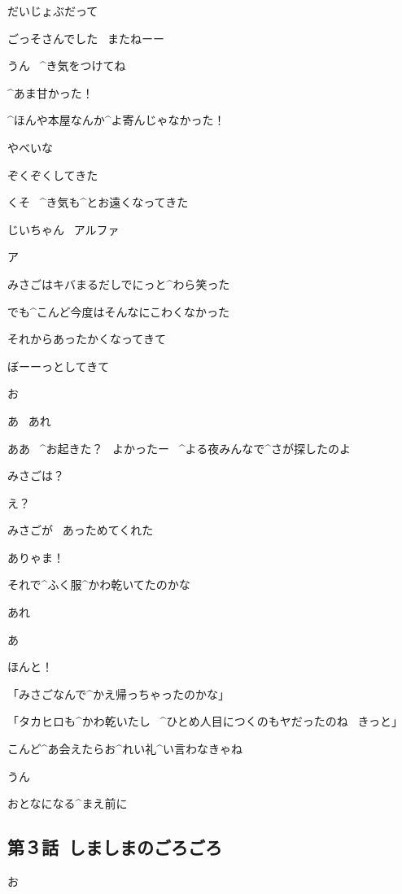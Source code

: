 \Takahiro だいじょぶだって

\Takahiro ごっそさんでした
\ またねーー

\Alpha うん
\ ^{き}{気}をつけてね

\page[56]
\Takahiro ^{あま}{甘}かった！

\Takahiro ^{ほんや}{本屋}なんか^{よ}{寄}んじゃなかった！

\page[57]
\Takahiro やべいな

\Takahiro ぞくぞくしてきた

\Takahiro くそ
\ ^{き}{気}も^{とお}{遠}くなってきた

\Takahiro じいちゃん
\ アルファ

\Takahiro ア

\page[59]
\Takahiro みさごはキバまるだしでにっと^{わら}{笑}った

\Takahiro でも^{こんど}{今度}はそんなにこわくなかった

\Takahiro それからあったかくなってきて

\Takahiro ぼーーっとしてきて

\page[60]
\Takahiro お

\Takahiro あ
\ あれ

\Alpha ああ
\ ^{お}{起}きた？
\ よかったー
\ ^{よる}{夜}みんなで^{さが}{探}したのよ

\Takahiro みさごは？

\Alpha え？

\page[61]
\Takahiro みさごが
\ あっためてくれた

\Alpha ありゃま！

\Alpha それで^{ふく}{服}^{かわ}{乾}いてたのかな

\Takahiro あれ

\Alpha あ

\Alpha ほんと！

\page[62]
\Takahiro 「みさごなんで^{かえ}{帰}っちゃったのかな」

\Alpha 「タカヒロも^{かわ}{乾}いたし
\ ^{ひとめ}{人目}につくのもヤだったのね
\ きっと」

\Alpha こんど^{あ}{会}えたらお^{れい}{礼}^{い}{言}わなきゃね

\Takahiro うん

\Takahiro おとなになる^{まえ}{前}に


\subsection{第３話\ しましまのごろごろ}

\page[65]
\Alpha お

